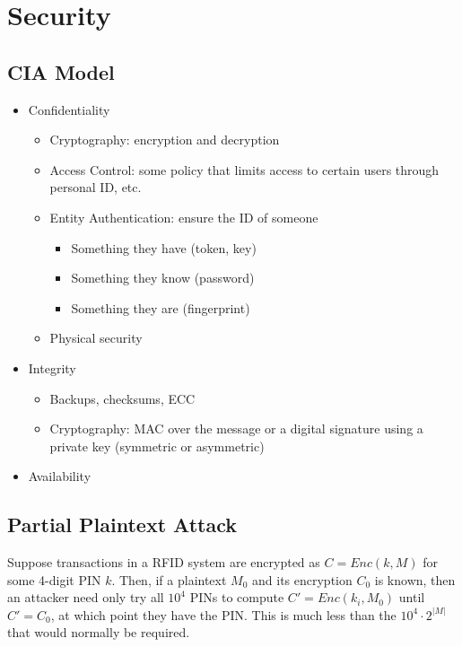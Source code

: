 \documentclass[11pt]{report}
\begin{document}
\chapter{Security}\label{sec:topic-3}
\section{CIA Model}
\begin{itemize}
	\item Confidentiality
	\begin{itemize}
		\item Cryptography: encryption and decryption
		\item Access Control: some policy that limits access to certain users through personal ID, etc.
		\item Entity Authentication: ensure the ID of someone
		\begin{itemize}
			\item Something they have (token, key)
			\item Something they know (password)
			\item Something they are (fingerprint)
		\end{itemize}
		\item Physical security
	\end{itemize}
	\item Integrity
	\begin{itemize}
		\item Backups, checksums, ECC
		\item Cryptography: MAC over the message or a digital signature using a private key (symmetric or asymmetric)
	\end{itemize}
	\item Availability
\end{itemize}

\section{Partial Plaintext Attack}
Suppose transactions in a RFID system are encrypted as $C = Enc(k, M)$ for some 4-digit PIN $k$. Then, if a plaintext $M_0$ and its encryption $C_0$ is known, then an attacker need only try all $10^4$ PINs to compute $C' = Enc(k_i, M_0)$ until $C' = C_0$, at which point they have the PIN. This is much less than the $10^4 \cdot 2^{|M|}$ that would normally be required.
\end{document}
